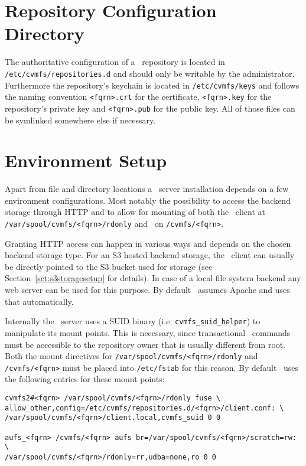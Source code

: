 \pagebreak

\section{Repository Configuration Directory}
The authoritative configuration of a \cvmfs\ repository is located in \linebreak
\texttt{/etc/cvmfs/repositories.d} and should only be writable by the administrator.
Furthermore the repository's keychain is located in \texttt{/etc/cvmfs/keys} and follows the naming convention \texttt{<fqrn>.crt} for the certificate, \texttt{<fqrn>.key} for the repository's private key and \texttt{<fqrn>.pub} for the public key.
All of those files can be symlinked somewhere else if necessary.

\pagebreak

\section{Environment Setup}
Apart from file and directory locations a \cvmfs\ server installation depends on a few environment configurations.
Most notably the possibility to access the backend storage through HTTP and to allow for mounting of both the \cvmfs\ client at \texttt{/var/spool/cvmfs/<fqrn>/rdonly} and \aufs\ on \texttt{/cvmfs/<fqrn>}.

Granting HTTP access can happen in various ways and depends on the chosen backend storage type.
For an S3 hosted backend storage, the \cvmfs\ client can usually be directly pointed to the S3 bucket used for storage (see Section~\ref{sct:s3storagesetup} for details).
In case of a local file system backend any web server can be used for this purpose.
By default \cvmfs\ assumes Apache and uses that automatically.

Internally the \cvmfs\ server uses a SUID binary (i.e. \texttt{cvmfs\_suid\_helper}) to manipulate its mount points.
This is necessary, since transactional \cvmfs\ commands must be accessible to the repository owner that is usually different from root.
Both the mount directives for \texttt{/var/spool/cvmfs/<fqrn>/rdonly} and \texttt{/cvmfs/<fqrn>} must be placed into \texttt{/etc/fstab} for this reason.
By default \cvmfs\ uses the following entries for these mount points:

\begin{verbatim}
cvmfs2#<fqrn> /var/spool/cvmfs/<fqrn>/rdonly fuse \
allow_other,config=/etc/cvmfs/repositories.d/<fqrn>/client.conf: \
/var/spool/cvmfs/<fqrn>/client.local,cvmfs_suid 0 0

aufs_<fqrn> /cvmfs/<fqrn> aufs br=/var/spool/cvmfs/<fqrn>/scratch=rw: \
/var/spool/cvmfs/<fqrn>/rdonly=rr,udba=none,ro 0 0
\end{verbatim}

